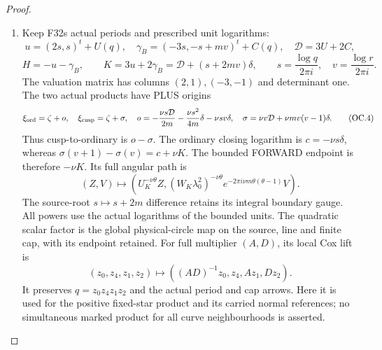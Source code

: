 \begin{proof}
\begin{enumerate}[label=\arabic*.]
\item Keep F32\textquotesingle s actual periods and prescribed unit logarithms:
\[
u=(2s,s)^t+U(q),\quad
\gamma_B=(-3s,-s+mv)^t+C(q),\quad\mathcal D=3U+2C,
\]
\[
H=-u-\gamma_B,\qquad
K=3u+2\gamma_B=\mathcal D+(s+2mv)\delta,
\qquad s=\frac{\log q}{2\pi i},\quad v=\frac{\log r}{2\pi i}.
\tag{OC.3}
\]
The valuation matrix has columns \((2,1),(-3,-1)\) and determinant
one. The two actual products have PLUS origins
\[
\xi_{\rm ord}=\zeta+o,\quad\xi_{\rm cusp}=\zeta+\sigma,\quad
 o=-\frac{\nu s\mathcal D}{2m}-\frac{\nu s^2}{4m}\delta-\nu sv\delta,
\quad\sigma=\nu v\mathcal D+\nu mv(v-1)\delta.
\tag{OC.4}
\]
Thus cusp-to-ordinary is \(o-\sigma\). The ordinary closing logarithm
is \(c=-\nu s\delta\), whereas
\(\sigma(v+1)-\sigma(v)=c+\nu K\). The bounded FORWARD endpoint
is therefore \(-\nu K\). Its full angular path is
\[
(Z,V)\longmapsto
\left(U_K^{-\nu\theta}Z,
(W_K\lambda_0^2)^{-\nu\theta}
 e^{-2\pi i\nu m\theta(\theta-1)}V\right).
\tag{OC.5}
\]
The source-root \(s\mapsto s+2m\) difference retains its integral
boundary gauge. All powers use the actual logarithms of the bounded
units. The quadratic scalar factor is the global physical-circle
map on the source, line and finite cap, with its endpoint retained.
For full multiplier \((A,D)\), its local Cox lift is
\[
(z_0,z_4,z_1,z_2)\longmapsto
((AD)^{-1}z_0,z_4,Az_1,Dz_2).
\tag{OC.6}
\]
It preserves \(q=z_0z_4z_1z_2\) and the actual period and cap arrows.
Here it is used for the positive fixed-star product and its carried
normal references; no simultaneous marked product for all curve
neighbourhoods is asserted.


\end{enumerate}
\end{proof}
